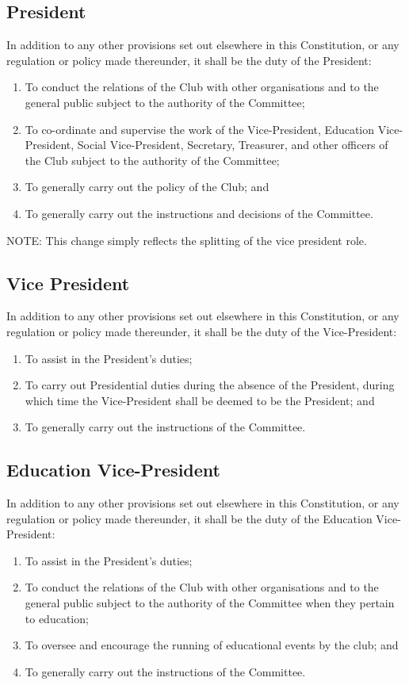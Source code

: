 \documentclass[11pt]{article} %
\begin{document}
\subsection{President}
In addition to any other provisions set out elsewhere in this Constitution, or any regulation or policy made thereunder, it shall be the duty of the President:
\begin{enumerate}
	\item To conduct the relations of the Club with other organisations and to the general public subject to the authority of the Committee;
	\item To co-ordinate and supervise the work of the {\color{red}Vice-President,} {\color{ForestGreen}Education Vice-President, Social Vice-President,} Secretary, Treasurer, and other officers of the Club subject to the authority of the Committee;
	\item To generally carry out the policy of the Club; and
	\item To generally carry out the instructions and decisions of the Committee.
\end{enumerate}
{\color{Cyan}NOTE:
This change simply reflects the splitting of the vice president role.
}

{\color{red} \subsection{Vice President}
In addition to any other provisions set out elsewhere in this Constitution, or any regulation or policy made thereunder, it shall be the duty of the Vice-President:
\begin{enumerate}
	\item To assist in the President's duties;
	\item To carry out Presidential duties during the absence of the President, during which time the Vice-President shall be deemed to be the President; and
	\item To generally carry out the instructions of the Committee.
\end{enumerate}}

{\color{ForestGreen} \subsection{Education Vice-President}
In addition to any other provisions set out elsewhere in this Constitution, or any regulation or policy made thereunder, it shall be the duty of the Education Vice-President:
\begin{enumerate}
	\item To assist in the President's duties;
	\item To conduct the relations of the Club with other organisations and to the general public subject to the authority of the Committee when they pertain to education;
	\item To oversee and encourage the running of educational events by the club; and
	\item To generally carry out the instructions of the Committee.
\end{enumerate}}
\end{document}
